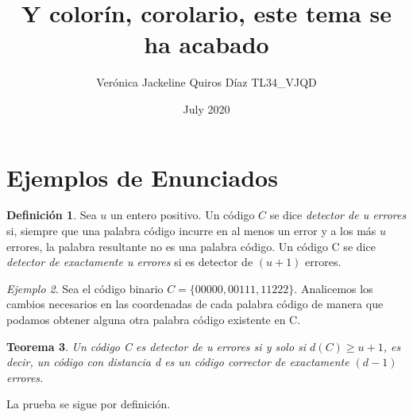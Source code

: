 \documentclass[12pt]{article}
\title{\textbf{Y colorín, corolario, este tema se ha acabado}}
\author{Verónica Jackeline Quiros Díaz  TL34\_VJQD}
\date{July 2020}
\begin{document}
\maketitle

\section{Ejemplos de Enunciados}
\theoremstyle{definition}
\newtheorem{def1}
{Definición}[section]
\begin{def1}
\label{def1}
    Sea $u$ un entero positivo. Un código $C$ se dice \textit{detector de u errores} si, siempre que una palabra código incurre en al menos un error  y a los más $u$ errores, la palabra resultante no es una palabra código. Un código C se dice \textit{detector de exactamente u errores} si es detector de $(u+1)$ errores.
\end{def1}

\theoremstyle{remark}
\newtheorem{ej1}
[def1]{Ejemplo}
\begin{ej1}
    Sea el código binario $C=\lbrace00000,00111,11222\rbrace$. Analicemos los cambios necesarios en las coordenadas de cada palabra código de manera que podamos obtener alguna otra palabra código existente en C. 
\end{ej1}

\theoremstyle{plain}
\newtheorem{th1}
[def1]{Teorema}
\begin{th1}
\label{th1}
    Un código C es \emph{detector de u errores} si y solo si $d(C)\geq u+1$, es decir, un código con distancia d es un código corrector de exactamente $(d-1)$ errores.
\end{th1}
\proof La prueba se sigue por definición.
\end{document}
